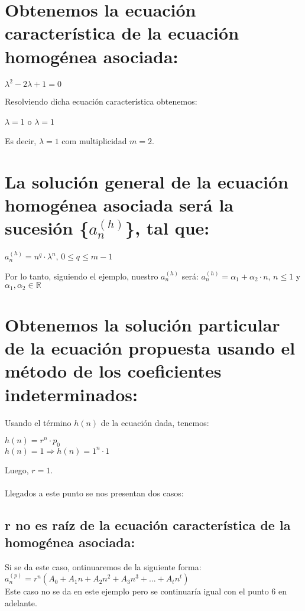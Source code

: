\documentclass[12pt,letterpaper]{article}
\begin{document}
\section{Obtenemos la ecuación característica de la ecuación homogénea asociada:}
\begin{center}
	$\lambda^{2}-2\lambda+1=0$
\end{center}
\noindent
Resolviendo dicha ecuación característica obtenemos:
\begin{center}
	$\lambda=1$ o $\lambda=1$\\
\end{center}
Es decir, $\lambda=1$ com multiplicidad $m=2$.

\section{La solución general de la ecuación homogénea asociada será la sucesión \{$a_{n}^{(h)}$\}, tal que:}
\begin{center}
	$a_{n}^{(h)}=n^q\cdot\lambda^n$, $0\leq$$q$$\leq$$m-1$
\end{center}
Por lo tanto, siguiendo el ejemplo, nuestro $a_{n}^{(h)}$ será:
$a_{n}^{(h)}=\alpha_{1}+\alpha_{2}\cdot n$, $n\leq 1$ y $\alpha_{1}, \alpha_{2} \in \mathds{R}$

\section{Obtenemos la solución particular de la ecuación propuesta usando el método de los coeficientes indeterminados:}
\noindent
Usando el término $h(n)$ de la ecuación dada, tenemos:
\begin{center}
	$h(n)=r^n\cdot p_{0}$\\
	$h(n)=1\Rightarrow h(n)=1^n\cdot 1$
\end{center}
Luego, $r=1$.\\\\
Llegados a este punto se nos presentan dos casos:

\subsection{r no es raíz de la ecuación característica de la homogénea asociada:}
\noindent
Si se da este caso, ontinuaremos de la siguiente forma:\\
$a_n^{(p)}=r^n(A_0+A_1n+A_2n^2+A_3n^3+...+A_tn^t)$\\
Este caso no se da en este ejemplo pero se continuaría igual con el punto 6 en adelante.
\end{document}
